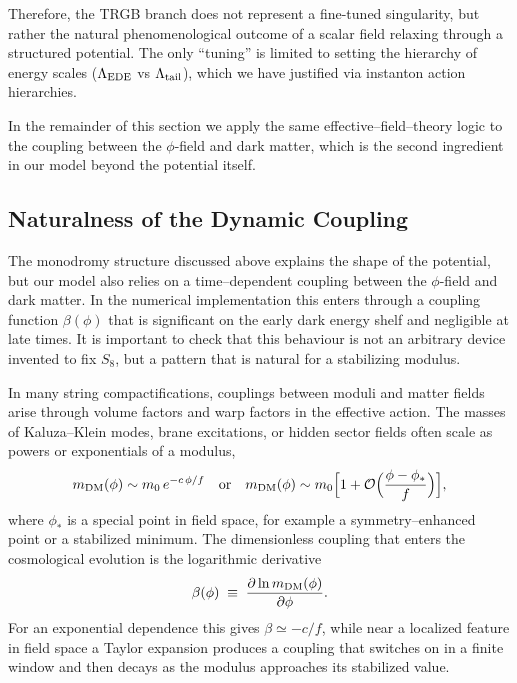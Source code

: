 \documentclass[a4paper,11pt]{article}
\begin{document}
Therefore, the TRGB branch does not represent a fine-tuned singularity, but rather the natural phenomenological outcome of a scalar field relaxing through a structured potential. The only ``tuning'' is limited to setting the hierarchy of energy scales ($\Lambda_{\rm EDE}$ vs $\Lambda_{\rm tail}$), which we have justified via instanton action hierarchies.

In the remainder of this section we apply the same effective--field--theory logic to the coupling between the $\phi$-field and dark matter, which is the second ingredient in our model beyond the potential itself.


\subsection{Naturalness of the Dynamic Coupling}
\label{sec:coupling_naturalness}

The monodromy structure discussed above explains the shape of the potential, but our model also relies on a time--dependent coupling between the $\phi$-field and dark matter. In the numerical implementation this enters through a coupling function $\beta(\phi)$ that is significant on the early dark energy shelf and negligible at late times. It is important to check that this behaviour is not an arbitrary device invented to fix $S_8$, but a pattern that is natural for a stabilizing modulus.

In many string compactifications, couplings between moduli and matter fields arise through volume factors and warp factors in the effective action. The masses of Kaluza--Klein modes, brane excitations, or hidden sector fields often scale as powers or exponentials of a modulus,
\begin{equation}
m_{\rm DM}(\phi) \sim m_0\,e^{-c\,\phi/f} \quad \text{or} \quad m_{\rm DM}(\phi) \sim m_0\Bigl[1 + \mathcal{O}\Bigl(\frac{\phi-\phi_\ast}{f}\Bigr)\Bigr],
\end{equation}
where $\phi_\ast$ is a special point in field space, for example a symmetry--enhanced point or a stabilized minimum. The dimensionless coupling that enters the cosmological evolution is the logarithmic derivative
\begin{equation}
\beta(\phi) \;\equiv\; \frac{\partial \ln m_{\rm DM}(\phi)}{\partial \phi}.
\end{equation}
For an exponential dependence this gives $\beta \simeq -c/f$, while near a localized feature in field space a Taylor expansion produces a coupling that switches on in a finite window and then decays as the modulus approaches its stabilized value.
\end{document}
